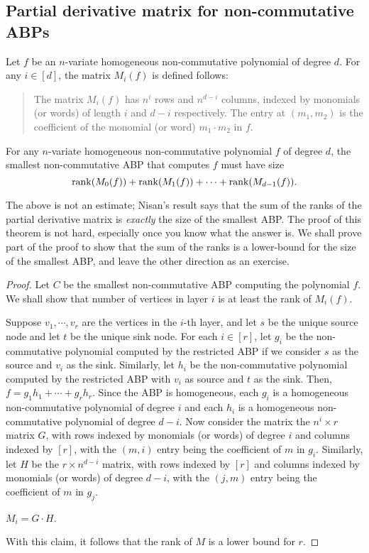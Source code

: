 \subsection{Partial derivative matrix for non-commutative ABPs}

\begin{definition} Let $f$ be an $n$-variate homogeneous non-commutative polynomial of degree $d$. For any $i \in [d]$, the matrix $M_i(f)$ is defined follows:
  \begin{quote}
    The matrix $M_i(f)$ has $n^i$ rows and $n^{d-i}$ columns, indexed by monomials (or words) of length $i$ and $d-i$ respectively. The entry at $(m_1, m_2)$ is the coefficient of the monomial (or word) $m_1 \cdot m_2$ in $f$. \qedhere
  \end{quote}
\end{definition}

\begin{theorem}\label{thm:nis-noncomm-abp}
For any $n$-variate homogeneous non-commutative polynomial $f$ of degree $d$, the smallest non-commutative ABP that computes $f$ must have size
\[
\operatorname{rank}(M_0(f)) + \operatorname{rank}(M_1(f)) +  \cdots + \operatorname{rank}(M_{d-1}(f)).
\]
\end{theorem}
The above is not an estimate; Nisan's result says that the sum of the ranks of the partial derivative matrix is \emph{exactly} the size of the smallest ABP.
The proof of this theorem is not hard, especially once you know what the answer is.
We shall prove part of the proof to show that the sum of the ranks is a lower-bound for the size of the smallest ABP, and leave the other direction as an exercise.

\begin{proof}
Let $C$ be the smallest non-commutative ABP computing the polynomial $f$. We shall show that number of vertices in layer $i$ is at least the rank of $M_i(f)$. 

Suppose $v_1,\cdots, v_r$ are the vertices in the $i$-th layer, and let $s$ be the unique source node and let $t$ be the unique sink node.
For each $i \in [r]$, let $g_i$ be the non-commutative polynomial computed by the restricted ABP if we consider $s$ as the source and $v_i$ as the sink.
Similarly, let $h_i$ be the non-commutative polynomial computed by the restricted ABP with $v_i$ as source and $t$ as the sink.
Then, $f = g_1 h_1 + \cdots + g_r h_r$. Since the ABP is homogeneous, each $g_i$ is a homogeneous non-commutative polynomial of degree $i$ and each $h_i$ is a homogeneous non-commutative polynomial of degree $d-i$. Now consider the matrix the $n^i \times r$ matrix $G$, with rows indexed by monomials (or words) of degree $i$ and columns indexed by $[r]$, with the $(m,i)$ entry being the coefficient of $m$ in $g_i$. Similarly, let $H$ be the $r \times n^{d-i}$ matrix, with rows indexed by $[r]$ and columns indexed by monomials (or words) of degree $d-i$, with the $(j,m)$ entry being the coefficient of $m$ in $g_j$. 
\begin{subclaim}\label{subclaim:Nisan-ABP-proof}
$M_i = G \cdot H$. 
\end{subclaim}
\noindent 
With this claim, it follows that the rank of $M$ is a lower bound for $r$. 
\end{proof}

